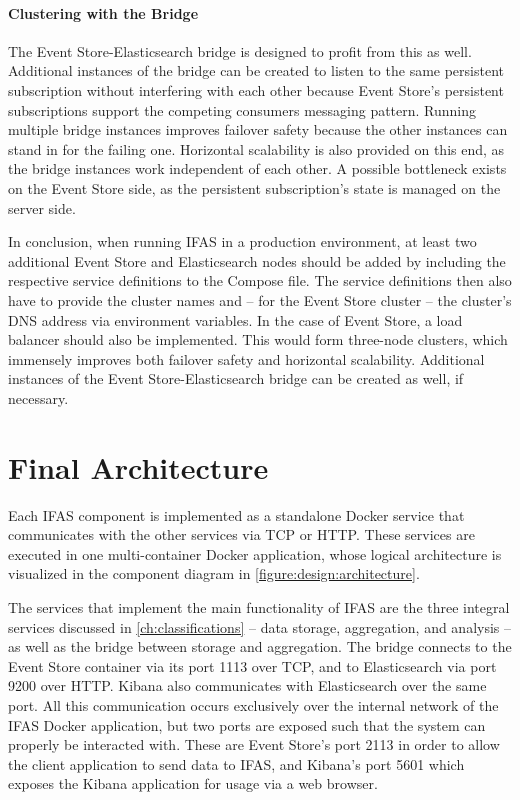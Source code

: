\paragraph{Clustering with the Bridge}
The Event Store-Elasticsearch bridge is designed to profit from this as well.
Additional instances of the bridge can be created to listen to the same persistent subscription without interfering with each other because Event Store's persistent subscriptions support the competing consumers messaging pattern.
Running multiple bridge instances improves failover safety because the other instances can stand in for the failing one.
Horizontal scalability is also provided on this end, as the bridge instances work independent of each other.
A possible bottleneck exists on the Event Store side, as the persistent subscription's state is managed on the server side.

In conclusion, when running \ac{IFAS} in a production environment, at least two additional Event Store and Elasticsearch nodes should be added by including the respective service definitions to the Compose file.
The service definitions then also have to provide the cluster names and -- for the Event Store cluster -- the cluster's DNS address via environment variables.
In the case of Event Store, a load balancer should also be implemented.
This would form three-node clusters, which immensely improves both failover safety and horizontal scalability.
Additional instances of the Event Store-Elasticsearch bridge can be created as well, if necessary.


\section{Final Architecture}
\label{section:design:architecture}

Each \ac{IFAS} component is implemented as a standalone Docker service that communicates with the other services via \ac{TCP} or \ac{HTTP}.
These services are executed in one multi-container Docker application, whose logical architecture is visualized in the component diagram in \cref{figure:design:architecture}.

The services that implement the main functionality of \ac{IFAS} are the three integral services discussed in \cref{ch:classifications} -- data storage, aggregation, and analysis -- as well as the bridge between storage and aggregation.
The bridge connects to the Event Store container via its port 1113 over \ac{TCP}, and to Elasticsearch via port 9200 over \ac{HTTP}.
Kibana also communicates with Elasticsearch over the same port.
All this communication occurs exclusively over the internal network of the \ac{IFAS} Docker application, but two ports are exposed such that the system can properly be interacted with.
These are Event Store's port 2113 in order to allow the client application to send data to \ac{IFAS}, and Kibana's port 5601 which exposes the Kibana application for usage via a web browser.

